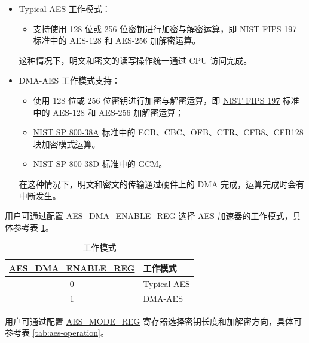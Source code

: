 \documentclass[main\_\_CN.tex]{subfiles}
\begin{document}
\begin{itemize}
    \item Typical AES 工作模式：
    \begin{itemize}
        \item 支持使用 128 位或 256 位密钥进行加密与解密运算，即 \href{https://nvlpubs.nist.gov/nistpubs/FIPS/NIST.FIPS.197.pdf}{NIST FIPS 197} 标准中的 AES-128 和 AES-256  加解密运算。
    \end{itemize}
    这种情况下，明文和密文的读写操作统一通过 CPU 访问完成。
    \item DMA-AES 工作模式支持：
    \begin{itemize}
        \item 使用 128 位或 256 位密钥进行加密与解密运算，即 \href{https://nvlpubs.nist.gov/nistpubs/FIPS/NIST.FIPS.197.pdf}{NIST FIPS 197} 标准中的 AES-128 和 AES-256 加解密运算；
        \item  \href{https://nvlpubs.nist.gov/nistpubs/Legacy/SP/nistspecialpublication800-38a.pdf}{NIST SP 800-38A} 标准中的 ECB、CBC、OFB、CTR、CFB8、CFB128 块加密模式运算。
        \item \href{https://nvlpubs.nist.gov/nistpubs/Legacy/SP/nistspecialpublication800-38d.pdf}{NIST SP 800-38D} 标准中的 GCM。
    \end{itemize}
    在这种情况下，明文和密文的传输通过硬件上的 DMA 完成，运算完成时会有中断发生。
\end{itemize}

用户可通过配置 \hyperref[regdesc:AESDMAENABLEREG]{AES\_DMA\_ENABLE\_REG} 选择 AES 加速器的工作模式，具体参考表 \ref{tab:aes-dma-enable}。

\begin{longtable}[c]{ |c|l| }
\caption{工作模式}
\label{tab:aes-dma-enable}
\\\hline
\rowcolor{lightgray}
\textbf{\hyperref[regdesc:AESDMAENABLEREG]{AES\_DMA\_ENABLE\_REG}}       & \textbf{工作模式}\\
    \hline
    0           & Typical AES    \\
    \hline
    1           & DMA-AES        \\
    \hline
\end{longtable}

用户可通过配置 \hyperref[regdesc:AESMODEREG]{AES\_MODE\_REG} 寄存器选择密钥长度和加解密方向，具体可参考表 \ref{tab:aes-operation}。
\end{document}
